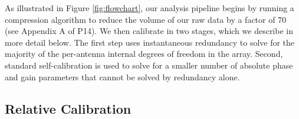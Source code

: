 \documentclass[twocolumn,numberedappendix]{emulateapj} \shorttitle{PSA64}
\begin{document}
As illustrated in Figure \ref{fig:flowchart},
our analysis pipeline begins by running a compression
algorithm to reduce the volume of our raw data by a factor of 70
(see Appendix A of P14). 
We then calibrate in two stages, which we describe in more detail below.  
The first step uses instantaneous redundancy to solve for the majority of the 
per-antenna internal degrees of freedom in the array.  Second, standard self-calibration is used 
to solve for a smaller number of
absolute phase and gain parameters that cannot be solved by redundancy alone. 

\subsection{Relative Calibration}
%         
%
\end{document}
